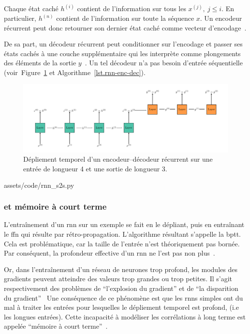 Chaque état caché \(h^{(i)}\) contient de l'information sur tous les \(x^{(j)},\ j\le i\).
En particulier, \(h^{(n)}\) contient de l'information sur toute la séquence \(x\).
Un encodeur récurrent peut donc retourner son dernier état caché comme vecteur d'encodage~\cite{deep-nmt-survey}.

De sa part, un décodeur récurrent peut conditionner sur l'encodage 
et passer ses états cachés à une couche supplémentaire 
qui les interprète comme plongements des éléments de la sortie \(y\)~\cite{Fathi_2021}.
Un tel décodeur n'a pas besoin d'entrée séquentielle 
(voir~Figure~\ref{fig.rnn-enc-dec} et Algorithme~\ref{lst.rnn-enc-dec}).

\begin{figure}[hbt]
    \begin{center}
        \includegraphics[width=\textwidth]{assets/images/rnn-enc-dec.png}
    \end{center}
    
    \caption[Dépliement temporel d'un encodeur--décodeur récurrent.]
    {Dépliement temporel d'un encodeur--décodeur récurrent  
    sur une entrée de longueur 4 et une sortie de longueur 3.}
    \label{fig.rnn-enc-dec}
\end{figure}


{assets/code/rnn_s2s.py}

\subsubsection{ et mémoire à court terme}

L'entraînement d'un \gls{rnn} sur un exemple se fait en le dépliant, 
puis en entraînant le \gls{ffn} qui résulte par rétro-propagation.
L'algorithme résultant s'appelle la \gls{bptt}.
Cela est problématique, car la taille de l'entrée n'est théoriquement pas bornée.
Par conséquent, la profondeur effective d'un \gls{rnn} ne l'est pas non plus~\cite{Fathi_2021}.

Or, dans l'entraînement d'un réseau de neurones trop profond,
les modules des gradients peuvent atteindre des valeurs trop grandes ou trop petites.
Il s'agit respectivement des problèmes de ``l'explosion du gradient'' 
et de ``la disparition du gradient''~\cite{Basodi_Ji_Zhang_Pan_2020}
Une conséquence de ce phénomène est que 
les \glspl{rnn} simples ont du mal à traiter les entrées pour lesquelles le dépliement temporel est profond,
(i.e les longues entrées).
Cette incapacité à modéliser les corrélations à long terme est appelée 
``mémoire à court terme''~\cite{Bengio_Simard_Frasconi_1994,Informatik_Bengio_Frasconi_Schmidhuber_2003}.


